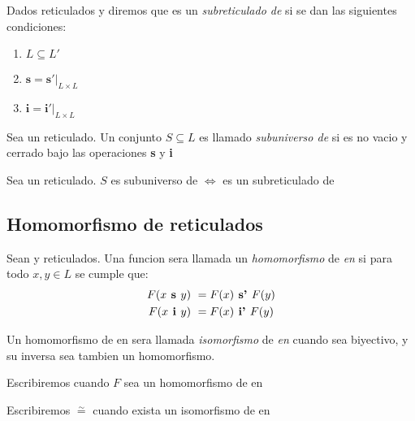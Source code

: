 \begin{definition}
  Dados reticulados \reticulAlg y  diremos que \reticulAlg
  es un \emph{subreticulado de}  si se dan las siguientes condiciones:
  \begin{enumerate}
    \item $L \subseteq L'$
    \item $\textbf{s} = \textbf{s}'\vert_{L\times L}$
    \item $\textbf{i} = \textbf{i}'\vert_{L\times L}$
  \end{enumerate}
\end{definition}
\begin{definition}
  Sea \reticulAlg un reticulado. Un conjunto $S \subseteq L$ es llamado \emph{subuniverso de} \reticulAlg
  si es no vacio y cerrado bajo las operaciones \textbf{s} y \textbf{i}
\end{definition}
\begin{remark}
  Sea \reticulAlg un reticulado. $S$ es subuniverso de \reticulAlg $\iff$ 
  es un subreticulado de \reticulAlg
\end{remark}

\subsection{Homomorfismo de reticulados}

\begin{definition}
  Sean \reticulAlg y  reticulados. Una funcion 
  sera llamada un \emph{homomorfismo} de \reticulAlg \emph{en}  si
  para todo $x, y \in L$ se cumple que:
  \begin{alignat*}{2}
    F(x\textbf{ s }y) &\ = F(x)\textbf{ s' }F(y)\\
    F(x\textbf{ i }y) &\ = F(x)\textbf{ i' }F(y)\\    
  \end{alignat*}

  Un homomorfismo de \reticulAlg en  sera llamada \emph{isomorfismo}
  de \reticulAlg \emph{en}  cuando sea biyectivo, y su inversa
  sea tambien un homomorfismo.

  Escribiremos  cuando $F$ sea un homomorfismo
  de \reticulAlg en 

  Escribiremos \reticulAlg $\overset{\sim}{=}$  cuando exista
  un isomorfismo de \reticulAlg en 
\end{definition}

